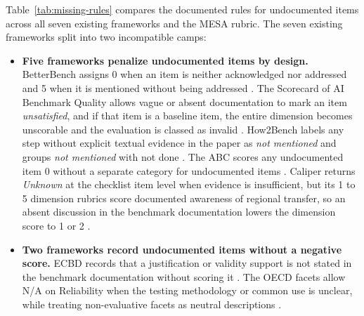 \documentclass[10pt,conference]{IEEEtran}
\begin{document}
Table~\ref{tab:missing-rules} compares the documented rules for undocumented items across all seven existing frameworks and the MESA rubric. The seven existing frameworks split into two incompatible camps:
\begin{itemize}
\item \textbf{Five frameworks penalize undocumented items by design.} BetterBench assigns 0 when an item is neither acknowledged nor addressed and 5 when it is mentioned without being addressed \cite{reuel_betterbench}. The Scorecard of AI Benchmark Quality allows vague or absent documentation to mark an item \emph{unsatisfied}, and if that item is a baseline item, the entire dimension becomes unscorable and the evaluation is classed as invalid \cite{san_joaquin_scorecard_2026}. How2Bench labels any step without explicit textual evidence in the paper as \emph{not mentioned} and groups \emph{not mentioned} with not done \cite{cao_how2bench_2025}. The ABC scores any undocumented item 0 without a separate category for undocumented items \cite{zhu_agentic_benchmark_checklist_2025}. Caliper returns \emph{Unknown} at the checklist item level when evidence is insufficient, but its 1 to 5 dimension rubrics score documented awareness of regional transfer, so an absent discussion in the benchmark documentation lowers the dimension score to 1 or 2 \cite{corona_benchmark_caliper_2026}.
\item \textbf{Two frameworks record undocumented items without a negative score.} ECBD records that a justification or validity support is not stated in the benchmark documentation without scoring it \cite{liu_ecbd_2024}. The OECD facets allow N/A on Reliability when the testing methodology or common use is unclear, while treating non-evaluative facets as neutral descriptions \cite{cohn_hernandez_orallo_oecd_2023}.
\end{itemize}
\end{document}
